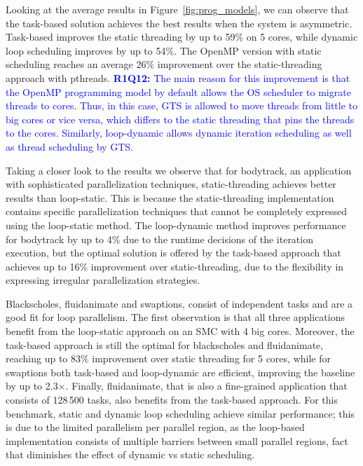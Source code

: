 Looking at the average results in Figure~\ref{fig:prog_models}, we can observe that the task-based solution 
achieves the best results when the system is asymmetric. Task-based improves the static 
threading by up to 59\% on 5 cores, while dynamic loop scheduling improves by up to 54\%.
The OpenMP version with static scheduling reaches an average 26\% improvement over the static-threading approach with pthreads. 
\textcolor{blue}{
\textbf{R1Q12:} The main reason for this improvement is that the OpenMP programming model by default allows the OS scheduler to migrate threads to cores. 
Thus, in this case, GTS is allowed to move threads from little to big cores or vice versa, which differs to the static threading that pins the threads to the cores.
Similarly, loop-dynamic allows dynamic iteration scheduling as well as thread scheduling by GTS.
}

Taking a closer look to the results we observe that for bodytrack, an application with sophisticated parallelization techniques, static-threading achieves better results than loop-static.
This is because the static-threading implementation contains specific parallelization techniques that cannot be completely expressed using the loop-static method.
The loop-dynamic method improves performance for bodytrack by up to 4\% due to the runtime decisions of the iteration execution, but the optimal solution is offered by the task-based approach that achieves up to 16\% improvement over static-threading, due to the flexibility in expressing irregular parallelization strategies.
  
Blackscholes, fluidanimate and swaptions, consist of independent tasks and are a good fit for loop parallelism. 
The first observation is that all three applications benefit from the loop-static approach on an SMC with 4 big cores. 
Moreover, the task-based approach is still the optimal for blackscholes and fluidanimate, reaching up to 83\% improvement over static threading for 5 cores, while for swaptions both task-based and loop-dynamic are efficient, improving the baseline by up to 2.3$\times$.
Finally, fluidanimate, that is also a fine-grained application that consists of 128\,500 tasks, also benefits from the task-based approach. 
For this benchmark, static and dynamic loop scheduling achieve similar performance; this is due to the limited parallelism per parallel region, as the loop-based implementation consists of multiple barriers between small parallel regions, fact that diminishes the effect of dynamic vs static scheduling. 

